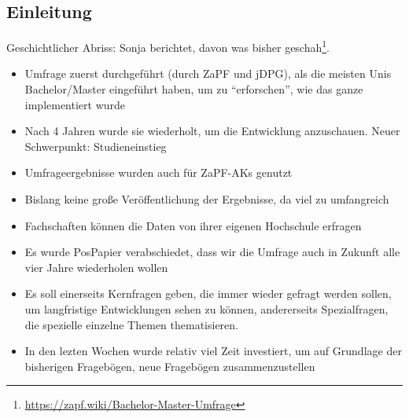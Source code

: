   \subsection*{Einleitung}
    Geschichtlicher Abriss: Sonja berichtet, davon was bisher geschah\footnote{\url{https://zapf.wiki/Bachelor-Master-Umfrage}}.
    \begin{itemize}
      \item Umfrage zuerst durchgeführt (durch ZaPF und jDPG), als die meisten Unis Bachelor/Master eingeführt haben, um zu “erforschen”, wie das ganze implementiert wurde
      \item Nach 4 Jahren wurde sie wiederholt, um die Entwicklung anzuschauen. Neuer Schwerpunkt: Studieneinstieg
      \item Umfrageergebnisse wurden auch für ZaPF-AKs genutzt
      \item Bislang keine große Veröffentlichung der Ergebnisse, da viel zu umfangreich
      \item Fachschaften können die Daten von ihrer eigenen Hochschule erfragen
      \item Es wurde PosPapier verabschiedet, dass wir die Umfrage auch in Zukunft alle vier Jahre wiederholen wollen
      \item Es soll einerseits Kernfragen geben, die immer wieder gefragt werden sollen, um langfristige Entwicklungen sehen zu können, andererseits Spezialfragen, die spezielle einzelne Themen thematisieren.
      \item In den lezten Wochen wurde relativ viel Zeit investiert, um auf Grundlage der bisherigen Fragebögen, neue Fragebögen zusammenzustellen
    \end{itemize}

